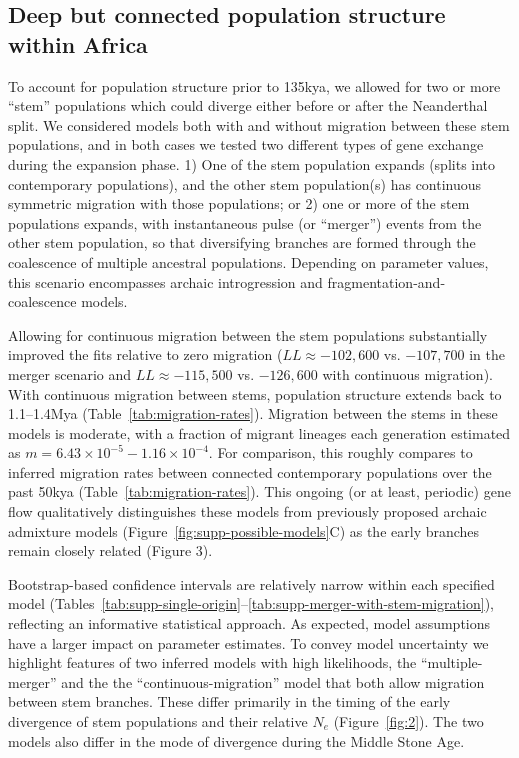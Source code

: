 \documentclass{article}
\begin{document}
\subsection*{Deep but connected population structure within Africa}

To account for population structure prior to 135kya, we allowed for two or more
“stem” populations which could diverge either before or after the Neanderthal
split. We considered models both with and without migration between these stem
populations, and in both cases we tested two different types of gene exchange
during the expansion phase. 1) One of the stem population expands (splits into
contemporary populations), and the other stem population(s) has continuous
symmetric migration with those populations; or 2) one or more of the stem
populations expands, with instantaneous pulse (or “merger”) events from the
other stem population, so that diversifying branches are formed through the
coalescence of multiple ancestral populations. Depending on parameter values,
this scenario encompasses archaic introgression and
fragmentation-and-coalescence models.

Allowing for continuous migration between the stem populations substantially
improved the fits relative to zero migration ($LL \approx -102,600$ vs.
$-107,700$ in the merger scenario and $LL \approx -115,500$ vs. $-126,600$ with
continuous migration). With continuous migration between stems, population
structure extends back to 1.1--1.4Mya (Table~\ref{tab:migration-rates}).
Migration between the stems in these models is moderate, with a fraction of
migrant lineages each generation estimated as
$m=6.43\times10^{-5}-1.16\times10^{-4}$. For comparison, this roughly compares
to inferred migration rates between connected contemporary populations over the
past 50kya (Table~\ref{tab:migration-rates}). This ongoing (or at least,
periodic) gene flow qualitatively distinguishes these models from previously
proposed archaic admixture models (Figure~\ref{fig:supp-possible-models}C) as
the early branches remain closely related (Figure 3).

Bootstrap-based confidence intervals are relatively narrow within each
specified model
(Tables~\ref{tab:supp-single-origin}--\ref{tab:supp-merger-with-stem-migration}),
reflecting an informative statistical approach. As expected, model assumptions
have a larger impact on parameter estimates. To convey model uncertainty we
highlight features of two inferred models with high likelihoods, the
“multiple-merger” and the the “continuous-migration” model that both allow
migration between stem branches. These differ primarily in the timing of the
early divergence of stem populations and their relative $N_e$
(Figure~\ref{fig:2}). The two models also differ in the mode of divergence
during the Middle Stone Age. 
\end{document}
